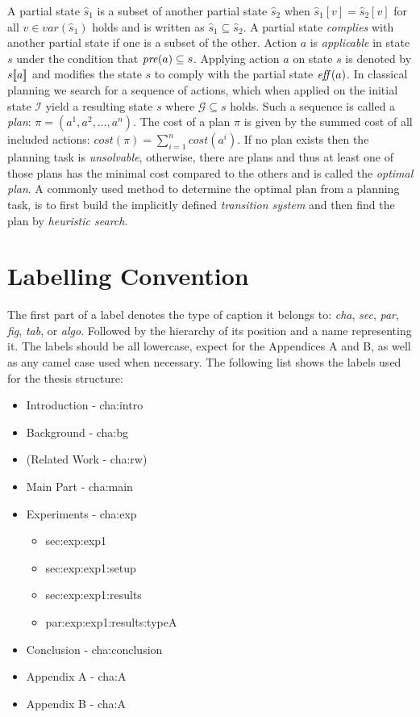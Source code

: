 A partial state $\hat{s}_1$ is a subset of another partial state $\hat{s}_2$ when $\hat{s}_1[v] = \hat{s}_2[v]$ for all $v \in var(\hat{s}_1)$ holds and is written as $\hat{s}_1 \subseteq \hat{s}_2$. A partial state \emph{complies} with another partial state if one is a subset of the other. Action $a$ is \emph{applicable} in state $s$ under the condition that $\operatorname{\mathit{pre}}(a) \subseteq s$. Applying action $a$ on state $s$ is denoted by $s[\![a]\!]$ and modifies the state $s$ to comply with the partial state $\operatorname{\mathit{eff}}(a)$. In classical planning we search for a sequence of actions, which when applied on the initial state $\mathcal{I}$ yield a resulting state $s$ where $\mathcal{G} \subseteq s$ holds. Such a sequence is called a \emph{plan}: $\pi = (a^1,a^2,\dots,a^n)$. The cost of a plan $\pi$ is given by the summed cost of all included actions: $cost(\pi) = \sum\nolimits_{i=1}^{n}cost(a^i)$. If no plan exists then the planning task is \emph{unsolvable}, otherwise, there are plans and thus at least one of those plans has the minimal cost compared to the others and is called the \emph{optimal plan}. A commonly used method to determine the optimal plan from a planning task, is to first build the implicitly defined \emph{transition system} and then find the plan by \emph{heuristic search}.


\section{Labelling Convention}

The first part of a label denotes the type of caption it belongs to: \emph{cha}, \emph{sec}, \emph{par}, \emph{fig}, \emph{tab}, or \emph{algo}. Followed by the hierarchy of its position and a name representing it. The labels should be all lowercase, expect for the Appendices A and B, as well as any camel case used when necessary. The following list shows the labels used for the thesis structure:

\begin{itemize}
  \item Introduction - cha:intro
  \item Background - cha:bg
  \item (Related Work - cha:rw)
  \item Main Part - cha:main
  \item Experiments - cha:exp
    \begin{itemize}
      \item sec:exp:exp1
      \item sec:exp:exp1:setup
      \item sec:exp:exp1:results
      \item par:exp:exp1:results:typeA
    \end{itemize}
  \item Conclusion - cha:conclusion
  \item Appendix A - cha:A
  \item Appendix B - cha:A
\end{itemize}


